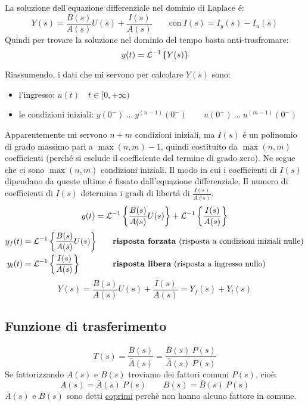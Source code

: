 \documentclass[../main.tex]{subfiles}
\begin{document}
		La soluzione dell'equazione differenziale nel dominio di Laplace \'{e}:
		\begin{equation}
			Y(s) = \frac{B(s)}{A(s)} U(s) + \frac{I(s)}{A(s)} \qquad \text{con}\: I(s) = I_y(s) - I_u(s) 
		\end{equation}
		Quindi per trovare la soluzione nel dominio del tempo basta anti-trasfromare:
		\[ y(t) = \mathcal{L}^{-1} \left\lbrace Y(s) \right\rbrace \]
		
		Riassumendo, i dati che mi servono per calcolare $ Y(s) $ sono:
		\begin{itemize}
			\item 
				l'ingresso: $ u(t) \quad t \in [0, +\infty) $
			\item 
				le condizioni iniziali: $ y(0^-)\ \dots\ y^{(n-1)}(0^-) \qquad u(0^-)\ \dots\ u^{(m-1)}(0^-) $ 
		\end{itemize}
	
		Apparentemente mi servono $ n+m $ condizioni iniziali, ma $ I(s) $ \'{e} un polinomio di grado massimo pari a $ \max(n,m) - 1 $, quindi costituito da $ \max(n,m) $ coefficienti (perch\'{e} si esclude il coefficiente del termine di grado zero). Ne segue che ci sono $ \max(n,m) $ condizioni iniziali. Il modo in cui i coefficienti di $ I(s) $ dipendano da queste ultime \'{e} fissato dall'equazione differenziale. Il numero di coefficienti di $ I(s) $ determina i gradi di libert\'{a} di $ \frac{I(s)}{A(s)} $.
		\[
			y(t) = \mathcal{L}^{-1} \left\lbrace  \frac{B(s)}{A(s)} U(s)  \right\rbrace + \mathcal{L}^{-1} \left\lbrace  \frac{I(s)}{A(s)}  \right\rbrace
		\]
		\begin{align*}
			y_f(t) &= \mathcal{L}^{-1} \left\lbrace  \frac{B(s)}{A(s)} U(s)  \right\rbrace \quad &&\text{\textbf{risposta forzata} (risposta a condizioni iniziali nulle)}
			\\
			y_l(t) &= \mathcal{L}^{-1} \left\lbrace  \frac{I(s)}{A(s)}  \right\rbrace \quad &&\text{\textbf{risposta libera} (risposta a ingresso nullo)}
		\end{align*}
		\[ 
			Y(s) = \frac{B(s)}{A(s)} U(s) + \frac{I(s)}{A(s)} = Y_f(s) + Y_l(s)
		\]
		
	\subsection{Funzione di trasferimento}
		\[
			T(s) = \frac{\bar{B}(s)}{\bar{A}(s)} = \frac{\bar{B}(s)\ P(s)}{\bar{A}(s)\ P(s)}
		\]
		Se fattorizzando $ A(s) $ e $ B(s) $ troviamo dei fattori comuni $ P(s) $, cio\`{e}:
		\[
			A(s) = \bar{A}(s)\ P(s) \qquad B(s) = \bar{B}(s)\ P(s)
		\]
		$ \bar{A}(s) $ e $ \bar{B}(s) $ sono detti \underline{coprimi} perch\`{e} non hanno alcuno fattore in comune.
		
\end{document}
